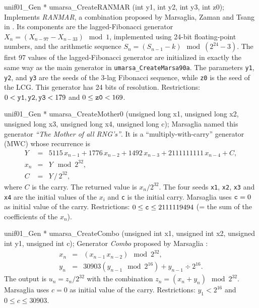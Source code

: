 unif01_Gen * umarsa_CreateRANMAR (int y1, int y2, int y3, int z0);
\endcode
  \tab Implements {\it RANMAR}, a combination proposed by Marsaglia,
 Zaman and Tsang
%
   in \cite{rMAR90b}. Its components are the  lagged-Fibonacci generator
   $X_n = (X_{n - 97} - X_{n - 33}) \mod 1$, implemented using 24-bit
   floating-point numbers,  and the  arithmetic sequence
   $S_n = (S_{n-1}-k) \mod (2^{24}-3)$.  The first 97 values of the
   lagged-Fibonacci generator are initialized in  exactly the same way
   as the main generator in {\tt umarsa\_CreateMarsa90a}.
   The parameters
   {\tt y1}, {\tt y2}, and {\tt y3} are the seeds of the
   3-lag Fibonacci sequence, while {\tt z0} is the seed of the LCG.
   This generator has 24 bits of resolution.
   Restrictions: $0 < {\tt y1}, {\tt y2}, {\tt y3} < 179$ and
   $0 \le {\tt z0} < 169$.
  \endtab
\code

unif01_Gen * umarsa_CreateMother0 (unsigned long x1, unsigned long x2,
   unsigned long x3, unsigned long x4, unsigned long c);
\endcode
  \tab Marsaglia \cite{rMAR96a} named this generator
   {\it ``The Mother of all RNG's''}. It is a ``multiply-with-carry''
%
   generator  (MWC) whose  recurrence is
  \begin {eqnarray*}
    Y &=& 5115\, x_{n-1} + 1776\,  x_{n-2} + 1492\,  x_{n-3} +
        2111111111\,  x_{n-4} + C, \\
     x_n &=& Y \mod 2^{32}, \\
      C &=& Y \, /\,  2^{32},
  \end {eqnarray*}
   where $C$ is the carry.
   The returned value is $x_n / 2^{32}$.
   The four seeds {\tt x1}, {\tt x2}, {\tt x3} and {\tt x4} are the initial
   values of the $x_i$ and {\tt c} is the initial carry.
   Marsaglia uses ${\tt c} = 0$ as initial value of the carry.
   Restrictions: $ 0 \le {\tt c} \le 2111119494$
   (= the sum of the coefficients of the $x_{n}$).
  \endtab
\code


unif01_Gen * umarsa_CreateCombo (unsigned int x1, unsigned int x2,
                                 unsigned int y1, unsigned int c);
\endcode
  \tab Generator {\em Combo\/} proposed by Marsaglia \cite{rMAR96a}:
%
  \begin {eqnarray*}
   x_n &=& (x_{n-1} \, x_{n-2}) \mod 2^{32}, \\
    y_n &=& 30903 \left(y_{n-1} \mod 2^{16}\right) + y_{n-1}\div 2^{16}.
  \end {eqnarray*}
   The output is  $u_n = z_n/2^{32}$ with the
   combination $z_n = (x_n + y_n) \mod 2^{32}$.
  Marsaglia uses $c = 0$ as initial value of the carry.
  Restrictions: $y_1 < 2^{16}$ and $0 \le c \le 30903$.
  \endtab
\code


